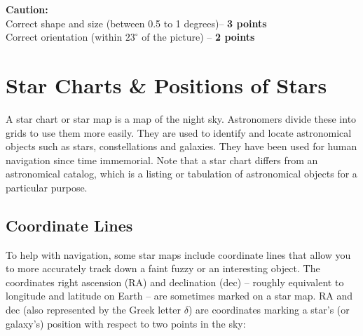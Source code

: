 \documentclass[a4paper,12pt]{extarticle}
\begin{document}
\begin{defi}
	\textbf{Caution:}\\
	{\color{red} Correct shape and size (between 0.5 to 1 degrees)-- \textbf{3 points}\\
		Correct orientation (within $23^\circ$ of the picture) -- \textbf{ 2 points}}
\end{defi}



\clearpage



\section{Star Charts \& Positions of Stars}

A star chart or star map is a map of the night sky. Astronomers divide these into grids to use them more easily. They are used to identify and locate astronomical objects such as stars, constellations and galaxies. They have been used for human navigation since time immemorial. Note that a star chart differs from an astronomical catalog, which is a listing or tabulation of astronomical objects for a particular purpose. 

\subsection{Coordinate Lines}

To help with navigation, some star maps include coordinate lines that allow you to more accurately track down a faint fuzzy or an interesting object. The coordinates right ascension (RA) and declination (dec) – roughly equivalent to longitude and latitude on Earth – are sometimes marked on a star map. RA and dec (also represented by the Greek letter $\delta$) are coordinates marking a star’s (or galaxy’s) position with respect to two points in the sky:
\end{document}
